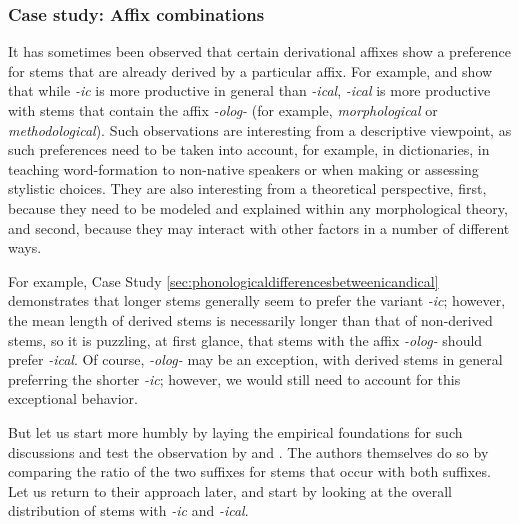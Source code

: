 \subsubsection{Case study: Affix combinations}\label{sec:affixcombinations}\largerpage

It has sometimes been observed that certain derivational affixes  show a preference for stems that are already derived by a particular affix.  For example, \citet{lindsay_rival_2011} and \citet{lindsay_natural_2013} show that while \textit{-ic} is more productive  in general than \textit{-ical}, \textit{-ical} is more productive with stems that contain the affix  \textit{-olog-} (for example, \textit{morphological} or \textit{methodological}). Such observations are interesting from a descriptive viewpoint, as such preferences need to be taken into account, for example, in dictionaries,  in teaching word\hyp{}formation to non\hyp{}native speakers or when making or assessing stylistic  choices. They are also interesting from a theoretical perspective, first, because they need to be modeled and explained  within any morphological  theory, and second, because they may interact with other factors in a number of different ways.

For example, Case Study \ref{sec:phonologicaldifferencesbetweenicandical} demonstrates that longer stems  generally seem to prefer the variant \textit{-ic}; however, the mean  length  of derived stems is necessarily longer than that of non\hyp{}derived stems,  so it is puzzling, at first glance, that stems with the affix  \textit{-olog-} should prefer \textit{-ical}. Of course, \textit{-olog-} may be an exception, with derived stems in general preferring the shorter \textit{-ic}; however, we would still need to account for this exceptional behavior.

But let us start more humbly by laying the empirical foundations for such discussions and test the observation by \citet{lindsay_rival_2011} and \citet{lindsay_natural_2013}. The authors themselves do so by comparing the ratio of the two suffixes  for stems that occur with both suffixes. Let us return to their approach later, and start by looking at the overall distribution  of stems  with \textit{-ic} and \textit{-ical}.

